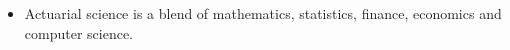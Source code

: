 



\begin{itemize}
\item Actuarial science is a blend of mathematics, statistics, finance, economics and computer science.
\end{itemize}


%
%
%
%
%
%
%



\nocite{*}

%
%
%

